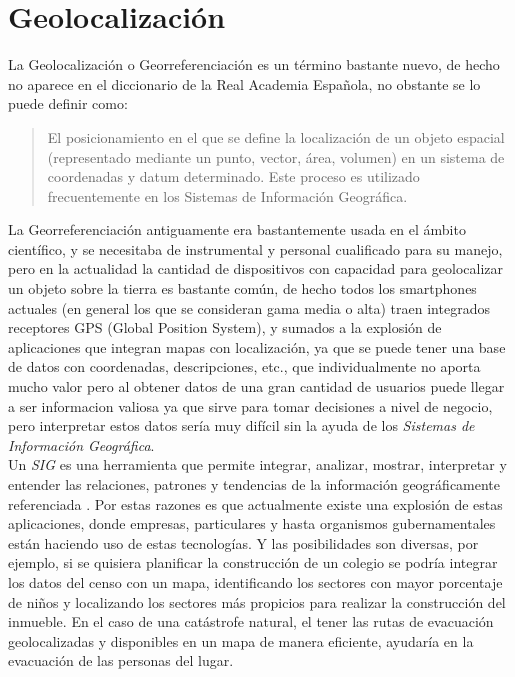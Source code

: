 \chapter{Geolocalización} %
\label{cha:geolocalizacion}

  La Geolocalización o Georreferenciación es un término bastante nuevo, de hecho no aparece en el diccionario de la Real Academia Española, no obstante se lo puede definir como:

  \begin{quote}
    El posicionamiento en el que se define la localización de un objeto espacial (representado mediante un punto, vector, área, volumen) en un sistema de coordenadas y datum determinado. Este proceso es utilizado frecuentemente en los Sistemas de Información Geográfica.\cite{Georreferenciacion}
  \end{quote}


  La Georreferenciación antiguamente era bastantemente usada en el ámbito científico, y se necesitaba de instrumental y personal cualificado para su manejo, pero en la actualidad la cantidad de dispositivos con capacidad para geolocalizar un objeto sobre la tierra es bastante común, de hecho todos los smartphones actuales (en general los que se consideran gama media o alta) traen integrados receptores GPS (Global Position System), y sumados a la explosión de aplicaciones  que integran mapas con localización, ya que se puede tener una base de datos con coordenadas, descripciones, etc., que individualmente no aporta mucho valor pero al obtener datos de una gran cantidad de usuarios puede llegar a ser informacion valiosa ya que sirve para tomar decisiones a nivel de negocio, pero interpretar estos datos sería muy difícil sin la ayuda de los \emph{Sistemas de Información Geográfica}.\\

  Un \emph{SIG} es una herramienta que permite integrar, analizar, mostrar, interpretar y  entender las relaciones, patrones y tendencias de la información geográficamente referenciada \cite{what_is_gis}.
  Por estas razones es que actualmente existe una explosión de estas aplicaciones, donde empresas, particulares y hasta organismos gubernamentales están haciendo uso de estas tecnologías.
  Y las posibilidades son diversas, por ejemplo, si se quisiera planificar la construcción de un colegio se podría integrar los datos del censo con un mapa, identificando los sectores con mayor porcentaje de niños y localizando los sectores más propicios para realizar la construcción del inmueble. En el caso de una catástrofe natural, el tener las rutas de evacuación geolocalizadas y disponibles en un mapa de manera eficiente,  ayudaría en la evacuación de las personas del lugar.\\


